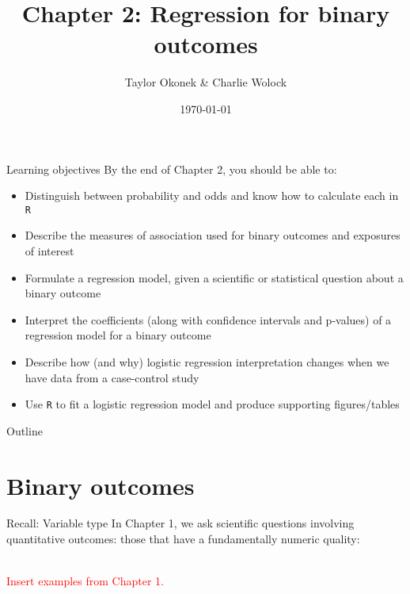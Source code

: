 \documentclass{beamer}
\title{Chapter 2: Regression for binary outcomes}
\author{Taylor Okonek \& Charlie Wolock}
\date{\today}
\begin{document}
	\begin{frame}
	\titlepage 
\end{frame}

\begin{frame}{Learning objectives}
	By the end of Chapter 2, you should be able to: 
	\begin{itemize}
		\item Distinguish between probability and odds and know how to calculate each in \texttt{R}
		\item Describe the measures of association used for binary outcomes and exposures of interest
		\item Formulate a regression model, given a scientific or statistical question about a binary outcome
		\item Interpret the coefficients (along with confidence intervals and p-values) of a regression model for a binary outcome
		\item Describe how (and why) logistic regression interpretation changes when we have data from a case-control study
		\item Use \texttt{R} to fit a logistic regression model and produce supporting figures/tables
	\end{itemize}
\end{frame}

\begin{frame}{Outline}
\tableofcontents
\end{frame}


\section{Binary outcomes}

\begin{frame}{Recall: Variable type}
	In Chapter 1, we ask scientific questions involving quantitative outcomes: those that have a fundamentally numeric quality: 
	\\~\
	
	\textcolor{red}{Insert examples from Chapter 1.}
\end{frame}
\end{document}
